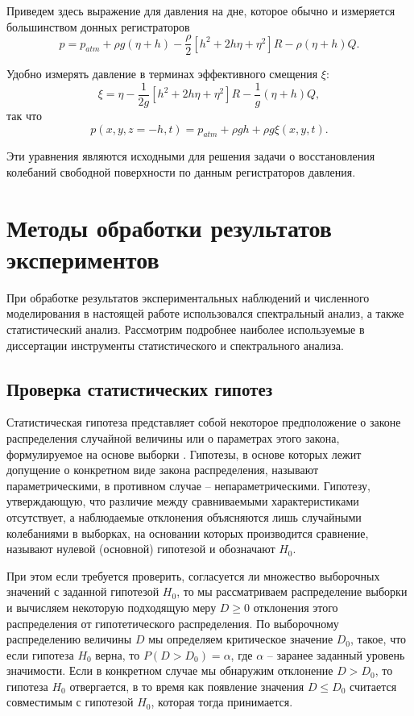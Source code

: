  Приведем здесь выражение для давления на дне, которое обычно и измеряется большинством донных регистраторов
\begin{equation} \label{GrindEQ__7_}
p=p_{atm} +\rho g(\eta +h)-\frac{\rho }{2} \left[h^{2} +2h\eta +\eta ^{2} \right]R-\rho (\eta +h)Q.
\end{equation}

Удобно измерять давление в терминах эффективного смещения $\xi$:
\begin{equation} \label{GrindEQ__8_}
\xi =\eta -\frac{1}{2g} \left[h^{2} +2h\eta +\eta ^{2} \right]R-\frac{1}{g} (\eta +h)Q,
\end{equation}
так что
\begin{equation} \label{GrindEQ__9_}
p(x,y,z=-h,t)=p_{atm} +\rho gh+\rho g\xi (x,y,t).
\end{equation}

Эти уравнения являются исходными для решения задачи о восстановления колебаний свободной поверхности по данным регистраторов давления.


\section{Методы обработки результатов экспериментов}


При обработке результатов экспериментальных наблюдений и численного моделирования в настоящей работе использовался спектральный анализ, а также статистический анализ. Рассмотрим подробнее наиболее используемые в диссертации инструменты статистического и спектрального анализа.

\subsection{Проверка статистических гипотез}

Статистическая гипотеза представляет собой некоторое предположение о законе распределения случайной величины или о параметрах этого закона, формулируемое на основе выборки \cite{gmurman, leman, hodasev}. Гипотезы, в основе которых лежит допущение о конкретном виде закона распределения, называют параметрическими, в противном случае – непараметрическими. Гипотезу, утверждающую, что различие между сравниваемыми характеристиками отсутствует, а наблюдаемые отклонения объясняются лишь случайными колебаниями в выборках, на основании которых производится сравнение, называют нулевой (основной) гипотезой и обозначают $H_0$.

При этом если требуется проверить, согласуется ли множество выборочных значений с заданной гипотезой $H_0$, то мы рассматриваем распределение выборки и вычисляем некоторую подходящую меру $D\ge0$ отклонения этого распределения от гипотетического распределения. По выборочному распределению величины $D$ мы определяем критическое значение $D_0$, такое, что если гипотеза $H_0$  верна, то $P(D>D_0)=\alpha$, где $\alpha$ -- заранее заданный уровень значимости. Если в конкретном случае мы обнаружим отклонение $D>D_0$, то гипотеза $H_0$ отвергается, в то время как появление значения $D\le D_0$ считается совместимым с гипотезой $H_0$, которая тогда принимается.

